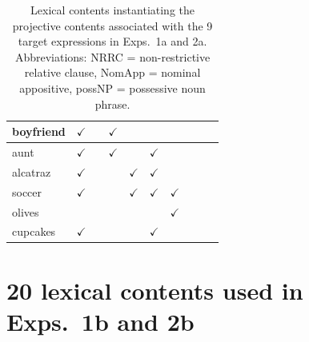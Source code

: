 \documentclass[11pt,fleqn]{article}
\newcommand{\6}{\mbox{$[\hspace*{-.6mm}[$}}
\newcommand{\9}{\mbox{$]\hspace*{-.6mm}]$}}
\begin{document}
\begin{table}[h!]
\begin{center}
\begin{tabular}{l|ccccccccc}
boyfriend & $\checkmark$ & & $\checkmark$ & & & & & &  \\

\hline

aunt & $\checkmark$ & & $\checkmark$ & & $\checkmark$ & & & &  \\

\hline

alcatraz & $\checkmark$ & & & $\checkmark$ & $\checkmark$ & & & &  \\

\hline

soccer & $\checkmark$ & & & $\checkmark$ & $\checkmark$ & $\checkmark$ & & &  \\

\hline

olives & & & & & & $\checkmark$ & & &  \\

\hline

cupcakes & $\checkmark$ & & & & $\checkmark$ & & & &  \\

\hline

\end{tabular}
\end{center}
\caption{Lexical contents instantiating the projective contents associated with the 9 target expressions in Exps.~1a and 2a. Abbreviations: NRRC = non-restrictive relative clause, NomApp = nominal appositive, possNP = possessive noun phrase.}\label{t-trigger-content-pairs}
\end{table}



\section{20 lexical contents used in Exps.~1b and 2b}\label{a-lexcontents1b}
\end{document}
